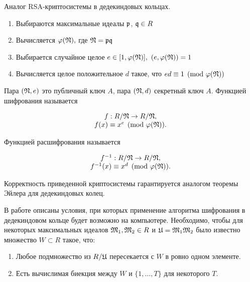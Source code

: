 \documentclass[_00_dissertation.tex]{subfiles}
\begin{document}
\begin{algorithm}\label{algorithm:RSA_in_dedekind}\cite{source:Petukhova}
    Аналог RSA-криптосистемы в дедекиндовых кольцах.

    \begin{enumerate}
        \item Выбираются максимальные идеалы $\mathfrak{p}$, $\mathfrak{q}\in R$

        \item Вычисляется $\varphi(\mathfrak{N}),$ где $\mathfrak{N} = \mathfrak{p} \mathfrak{q}$

        \item Выбирается случайное целое $e \in [1, \varphi(\mathfrak{N})],$ $(e, \varphi(\mathfrak{N}))=1$

        \item Вычисляется целое положительное $d$ такое, что $ed \equiv 1 \pmod{\varphi(\mathfrak{N})}$
    \end{enumerate}

    Пара $(\mathfrak{N}, e)$ это публичный ключ $A$, пара $(\mathfrak{N}, d)$ секретный ключ $A$.
    Функцией шифрования называется

    \begin{equation*}
        \begin{array}{c}
            f: R/\mathfrak{N} \to R/\mathfrak{N},\\
            f(x) \equiv x^{e} \pmod{\varphi(\mathfrak{N})}.
        \end{array}
    \end{equation*}

    Функцией расшифрования называется

    \begin{equation*}
        \begin{array}{c}
            f^{-1}: R/\mathfrak{N} \to R/\mathfrak{N},\\
            f^{-1}(x) \equiv x^{d}\pmod{\varphi(\mathfrak{N})}.
        \end{array}
    \end{equation*}
\end{algorithm}

\begin{remark}
    Корректность приведенной криптосистемы гарантируется аналогом теоремы Эйлера для дедекиндовых колец.
\end{remark}

\begin{remark}
    В работе \cite{Petukhova} описаны условия, при которых применение алгоритма шифрования в дедекиндовом кольце будет возможно на компьютере.
    Необходимо, чтобы для некоторых максимальных идеалов $\mathfrak{M}_1, \mathfrak{M}_2 \in R$ и $\mathfrak{U} = \mathfrak{M}_1\mathfrak{M}_2$ было известно множество $W \subset R$ такое, что:
    \begin{enumerate}
        \item Любое подмножество из $R/\mathfrak{U}$ пересекается с $W$ в ровно одном элементе.
        
        \item Есть вычислимая биекция между $W$ и $\{1, \dots, T\}$ для некоторого $T$.
    \end{enumerate}
\end{remark}
\end{document}
